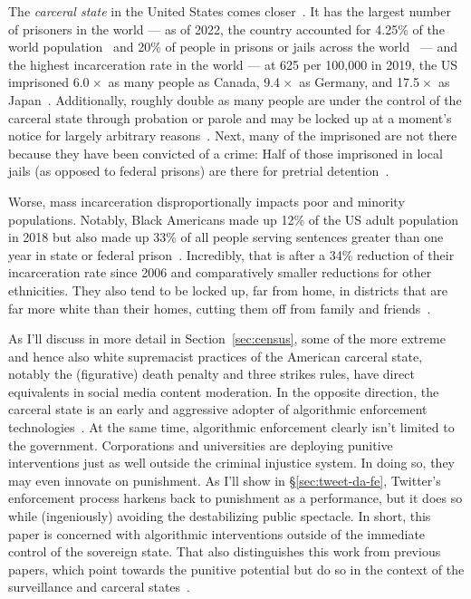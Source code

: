 The \emph{carceral state} in the United States comes closer~\cite{Simon2007}. It
has the largest number of prisoners in the world — as of 2022, the country
accounted for 4.25\% of the world population~\cite{Worldometer2023} and 20\% of
people in prisons or jails across the world~\cite{SawyerWagner2022} — and the
highest incarceration rate in the world — at 625 per 100,000 in 2019, the US
imprisoned 6.0$\mspace{1mu}\times$ as many people as Canada,
9.4$\mspace{1mu}\times$ as Germany, and 17.5$\mspace{1mu}\times$ as
Japan~\cite{WorldPrisonBrief2023}. Additionally, roughly double as many people
are under the control of the carceral state through probation or parole and may
be locked up at a moment's notice for largely arbitrary
reasons~\cite{SawyerWagner2022}. Next, many of the imprisoned are not there
because they have been convicted of a crime: Half of those imprisoned in local
jails (as opposed to federal prisons) are there for pretrial
detention~\cite{SawyerWagner2022}.

Worse, mass incarceration disproportionally impacts poor and minority
populations. Notably, Black Americans made up 12\% of the US adult population in
2018 but also made up 33\% of all people serving sentences greater than one year
in state or federal prison~\cite{Gramlich2020}. Incredibly, that is after a 34\%
reduction of their incarceration rate since 2006 and comparatively smaller
reductions for other ethnicities. They also tend to be locked up, far from home,
in districts that are far more white than their homes, cutting them off from
family and friends~\cite{WagnerKopf2015}.

As I'll discuss in more detail in Section~\ref{sec:census}, some of the more
extreme and hence also white supremacist practices of the American carceral
state, notably the (figurative) death penalty and three strikes rules, have
direct equivalents in social media content moderation. In the opposite
direction, the carceral state is an early and aggressive adopter of algorithmic
enforcement
technologies~\cite{AngwinLarsonea2016,EPIC2020,Hao2019,ReddenODonovanDixea2020,Yampolskiy2016}.
At the same time, algorithmic enforcement clearly isn't limited to the
government. Corporations and universities are deploying punitive interventions
just as well outside the criminal injustice system. In doing so, they may even
innovate on punishment. As I'll show in \S\ref{sec:tweet-da-fe}, Twitter's
enforcement process harkens back to punishment as a performance, but it does so
while (ingeniously) avoiding the destabilizing public spectacle. In short, this
paper is concerned with algorithmic interventions outside of the immediate
control of the sovereign state. That also distinguishes this work from previous
papers, which point towards the punitive potential but do so in the context of
the surveillance and carceral
states~\cite{DehlendorfGerety2021,McElroyWhittakerea2021}.

